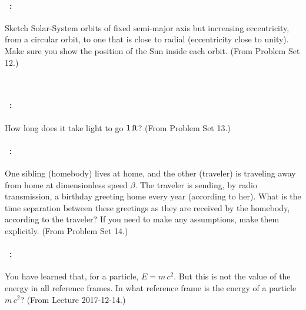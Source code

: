 \documentclass[12pt]{article} 
\begin{document}
\paragraph{\problemname~\theproblem:}%
Sketch Solar-System orbits of fixed semi-major axis but increasing
eccentricity, from a circular orbit, to one that is close to radial
(eccentricity close to unity). Make sure you show the position of
the Sun inside each orbit.
(From Problem Set 12.)

\vfill
~
\clearpage

\paragraph{\problemname~\theproblem:}%
How long does it take light to go $1\,\mathrm{ft}$?
(From Problem Set 13.)

\vfill

\paragraph{\problemname~\theproblem:}%
One sibling (homebody) lives at home, and the other (traveler) is
traveling away from home at dimensionless speed $\beta$. The traveler
is sending, by radio transmission, a birthday greeting home every year
(according to her). What is the time separation between these
greetings as they are received by the homebody, according to the
traveler? If you need to make any assumptions, make them explicitly.
(From Problem Set 14.)

\vfill

\paragraph{\problemname~\theproblem:}%
You have learned that, for a particle, $E=m\,c^2$. But this is not
the value of the energy in all reference frames. In what reference
frame is the energy of a particle $m\,c^2$?
(From Lecture 2017-12-14.)

\vfill
~
\end{document}
